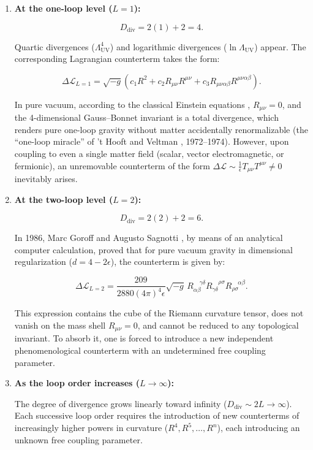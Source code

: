 \documentclass[11pt,a4paper]{article}
\theoremstyle{definition}
\begin{document}
\begin{enumerate}
\item \textbf{At the one-loop level ($L = 1$):}

\begin{equation*}
D_{\text{div}} = 2(1) + 2 = 4.
\end{equation*}

Quartic divergences ($\Lambda_{\text{UV}}^4$) and logarithmic divergences ($\ln \Lambda_{\text{UV}}$) appear. The corresponding Lagrangian counterterm takes the form:

\begin{equation*}
\Delta \mathcal{L}_{L=1} = \sqrt{-g} \left( c_1 R^2 + c_2 R_{\mu\nu} R^{\mu\nu} + c_3 R_{\mu\nu\alpha\beta} R^{\mu\nu\alpha\beta} \right).
\end{equation*}

In pure vacuum, according to the classical Einstein equations \cite{ref1}, $R_{\mu\nu} = 0$, and the 4-dimensional Gauss--Bonnet invariant is a total divergence, which renders pure one-loop gravity without matter accidentally renormalizable (the ``one-loop miracle'' of 't Hooft and Veltman \cite{ref2}, 1972--1974). However, upon coupling to even a single matter field (scalar, vector electromagnetic, or fermionic), an unremovable counterterm of the form $\Delta\mathcal{L} \sim \frac{1}{\epsilon} T_{\mu\nu} T^{\mu\nu} \ne 0$ inevitably arises.

\item \textbf{At the two-loop level ($L = 2$):}

\begin{equation*}
D_{\text{div}} = 2(2) + 2 = 6.
\end{equation*}

In 1986, Marc Goroff and Augusto Sagnotti \cite{ref3}, by means of an analytical computer calculation, proved that for pure vacuum gravity in dimensional regularization ($d = 4 - 2\epsilon$), the counterterm is given by:

\begin{equation*}
\Delta \mathcal{L}_{L=2} = \frac{209}{2880 (4\pi)^4 \epsilon} \sqrt{-g} \, R_{\alpha\beta}^{\quad\gamma\delta} R_{\gamma\delta}^{\quad\rho\sigma} R_{\rho\sigma}^{\quad\alpha\beta}.
\end{equation*}

This expression contains the cube of the Riemann curvature tensor, does not vanish on the mass shell $R_{\mu\nu} = 0$, and cannot be reduced to any topological invariant. To absorb it, one is forced to introduce a new independent phenomenological counterterm with an undetermined free coupling parameter.

\item \textbf{As the loop order increases ($L \to \infty$):}

The degree of divergence grows linearly toward infinity ($D_{\text{div}} \sim 2L \to \infty$). Each successive loop order requires the introduction of new counterterms of increasingly higher powers in curvature ($R^4, R^5, \dots, R^n$), each introducing an unknown free coupling parameter.
\end{enumerate}
\end{document}
